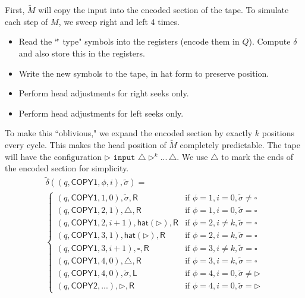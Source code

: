 \documentclass[12pt]{article}
\begin{document}
First, $\tilde{M}$ will copy the input into the encoded section of the tape. To simulate each step of $M$, we sweep right and left 4 times.
\begin{itemize}
\item{Read the ``\^\, type" symbols into the registers (encode them in $Q$). Compute $\delta$ and also store this in the registers.}
\item{Write the new symbols to the tape, in hat form to preserve position.}
\item{Perform head adjustments for right seeks only.}
\item{Perform head adjustments for left seeks only.}
\end{itemize}
To make this ``oblivious," we expand the encoded section by exactly $k$ positions every cycle. This makes the head position of $\tilde{M}$ completely predictable. The tape will have the configuration $\triangleright \texttt{ input } \triangle \triangleright^k ...\, \triangle$. We use $\triangle$ to mark the ends of the encoded section for simplicity.
\begin{multline*}
\tilde{\delta}((q, \textsf{COPY1}, \phi, i), \tilde{\sigma}) = \\
\begin{cases}
(q, \textsf{COPY1}, 1, 0), \tilde{\sigma}, \textsf{R} & \text{if } \phi = 1, i = 0, \tilde{\sigma} \neq \square \\
(q, \textsf{COPY1}, 2, 1), \triangle, \textsf{R} & \text{if } \phi = 1, i = 0, \tilde{\sigma} = \square \\
(q, \textsf{COPY1}, 2, i+1), \textsf{hat}(\triangleright), \textsf{R} & \text{if } \phi = 2, i \neq k, \tilde{\sigma} = \square \\
(q, \textsf{COPY1}, 3, 1), \textsf{hat}(\triangleright), \textsf{R} & \text{if } \phi = 2, i = k, \tilde{\sigma} = \square \\
(q, \textsf{COPY1}, 3, i+1), \square, \textsf{R} & \text{if } \phi = 3, i \neq k, \tilde{\sigma} = \square \\
(q, \textsf{COPY1}, 4, 0), \triangle, \textsf{R} & \text{if } \phi = 3, i = k, \tilde{\sigma} = \square \\
(q, \textsf{COPY1}, 4, 0), \tilde{\sigma}, \textsf{L} & \text{if } \phi = 4, i = 0, \tilde{\sigma} \neq \triangleright \\
(q, \textsf{COPY2}, ...), \triangleright, \textsf{R} & \text{if } \phi = 4, i = 0, \tilde{\sigma} = \triangleright
\end{cases}
\end{multline*}
\end{document}

